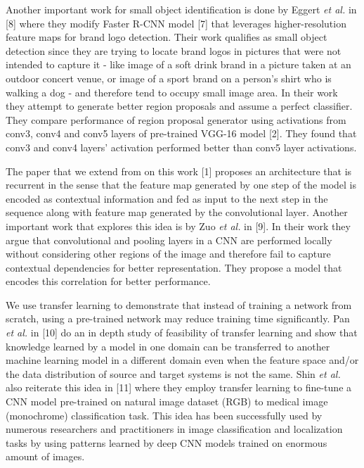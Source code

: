 \documentclass [11pt,letterpaper ,twoside ,openany ]{report}
\begin{document}
    Another important work for small object identification is done by Eggert \textit{et al.} in [8] where they modify Faster R-CNN model [7] that leverages higher-resolution feature maps for brand logo detection. Their work qualifies as small object detection since they are trying to locate brand logos in pictures that were not intended to capture it - like  image of a soft drink brand in a picture taken at an outdoor concert venue, or image of a sport brand on a person's shirt who is walking a dog - and therefore tend to occupy small image area. In their work they attempt to generate better region proposals and assume a perfect classifier. They compare performance of  region proposal generator using activations from conv3, conv4 and conv5 layers of pre-trained VGG-16 model [2]. They found that conv3 and conv4 layers' activation performed better than conv5 layer activations. 

    The paper that we extend from on this work [1] proposes an architecture that is recurrent in the sense that the feature map generated by one step of the model is encoded as contextual information and fed as input to the next step in the sequence along with feature map generated by the convolutional layer. Another important work that explores this idea is by Zuo \textit {et al.} in [9]. In their work they argue that convolutional and pooling layers in a CNN are performed locally without considering other regions of the image and therefore fail to capture contextual dependencies for better representation. They propose a model that encodes this correlation for better performance.

    We use transfer learning to demonstrate that instead of training a network from scratch, using a pre-trained network may reduce  training time significantly. Pan \textit {et al.} in [10] do an in depth study of feasibility of transfer learning and show that knowledge learned by a model in one domain can be transferred to another machine learning model in a different domain even when the feature space and/or the data distribution of source and target systems is not the same. Shin \textit {et al.} also reiterate this idea in [11] where they employ transfer learning to fine-tune a CNN model pre-trained on natural image dataset (RGB) to medical image (monochrome) classification task. This idea has been successfully used by numerous researchers and practitioners in image classification and localization tasks by using patterns learned by deep CNN models trained on enormous amount of images. 
\end{document}
